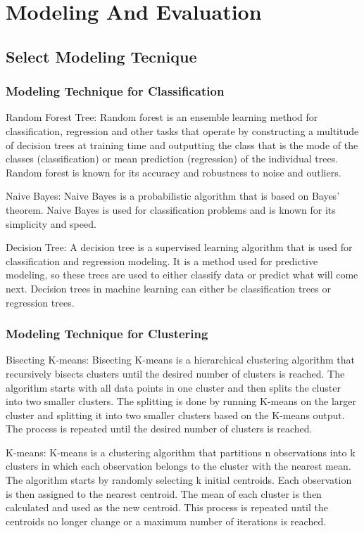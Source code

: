 \chapter{Modeling And Evaluation}

\section{Select Modeling Tecnique}

\subsection{Modeling Technique for Classification}
Random Forest Tree: Random forest is an ensemble learning method for classification, regression and other tasks that operate by constructing a multitude of decision trees at training time and outputting the class that is the mode of the classes (classification) or mean prediction (regression) of the individual trees. Random forest is known for its accuracy and robustness to noise and outliers.

Naive Bayes: Naive Bayes is a probabilistic algorithm that is based on Bayes’ theorem. Naive Bayes is used for classification problems and is known for its simplicity and speed.

Decision Tree: A decision tree is a supervised learning algorithm that is used for classification and regression modeling. It is a method used for predictive modeling, so these trees are used to either classify data or predict what will come next. Decision trees in machine learning can either be classification trees or regression trees. 

\subsection{Modeling Technique for Clustering}

Bisecting K-means: Bisecting K-means is a hierarchical clustering algorithm that recursively bisects clusters until the desired number of clusters is reached. The algorithm starts with all data points in one cluster and then splits the cluster into two smaller clusters. The splitting is done by running K-means on the larger cluster and splitting it into two smaller clusters based on the K-means output. The process is repeated until the desired number of clusters is reached.

K-means: K-means is a clustering algorithm that partitions n observations into k clusters in which each observation belongs to the cluster with the nearest mean. The algorithm starts by randomly selecting k initial centroids. Each observation is then assigned to the nearest centroid. The mean of each cluster is then calculated and used as the new centroid. This process is repeated until the centroids no longer change or a maximum number of iterations is reached.

